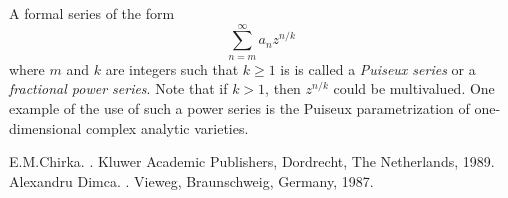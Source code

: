 \documentclass[12pt]{article}
\theoremstyle{theorem}
\theoremstyle{definition}
\theoremstyle{remark}
\begin{document}
A formal series of the form
\begin{equation*}
\sum_{n=m}^\infty a_n z^{n/k}
\end{equation*}
where $m$ and $k$ are integers such that $k \geq 1$ is
is called a {\em Puiseux series} or a {\em fractional power series}.  Note that if $k > 1$, then $z^{n/k}$ could be multivalued.  One example of the use of such a power series is the Puiseux parametrization of one-dimensional complex analytic varieties.

\begin{thebibliography}{9}
E.\@ M.\@ Chirka.
{\em {}}.
Kluwer Academic Publishers, Dordrecht, The Netherlands, 1989.
Alexandru Dimca.
{\em {}}.
Vieweg, Braunschweig, Germany, 1987.
\end{thebibliography}
\end{document}
